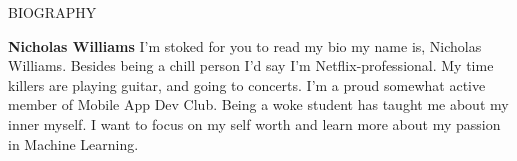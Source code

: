 \documentclass{bio}%
\begin{document}
%
\normalsize%
\begin{flushleft}%
\newcommand{\EducationEntry}[1]{
                            {\bf California Polytechnic State University}
                            \hfill
                            {\em September {#1} - Present}
                        }%
\newcommand{\BoldHeading}[1]{
                            {\bf{#1}\sectionskip{\medskip}}
                        }%
\newcommand{\DatedEntry}[2]{
                            \item{#1} 
                            \hfill
                            {\em{#2}}
                        }%
\newcommand{\FirstDatedEntry}[2]{
                            \text{#1} 
                            \hfill
                            {\em{#2}}
                        }%
\begin{rSection}{BIOGRAPHY}%
\BoldHeading{Nicholas Williams}%
\linebreak%
I'm stoked for you to read my bio my name is, Nicholas Williams. Besides being a chill person I'd say I'm Netflix{-}professional. My time killers are playing guitar, and going to concerts. I'm a proud somewhat active member of Mobile App Dev Club. Being a woke student has taught me about my inner myself. I want to focus on my self worth and learn more about my passion in Machine Learning. %
\end{rSection}%
\end{flushleft}%
\end{document}
